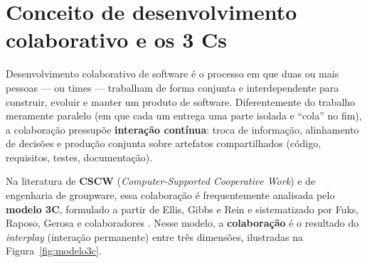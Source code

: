 \documentclass[
    12pt,
    oneside,
    a4paper,
    article,
    section=TITLE,
    sumario=abnt-6027-2012
]{abntex2}
\begin{document}
\OnehalfSpacing
{}

\imprimircapa

\textual

\section{Conceito de desenvolvimento colaborativo e os 3 Cs}
\label{sec:3cs}

Desenvolvimento colaborativo de software é o processo em que duas ou mais pessoas --- ou times --- trabalham de forma conjunta e interdependente para construir, evoluir e manter um produto de software. Diferentemente do trabalho meramente paralelo (em que cada um entrega uma parte isolada e ``cola'' no fim), a colaboração pressupõe \textbf{interação contínua}: troca de informação, alinhamento de decisões e produção conjunta sobre artefatos compartilhados (código, requisitos, testes, documentação).

Na literatura de \textbf{CSCW} (\textit{Computer-Supported Cooperative Work}) e de engenharia de groupware, essa colaboração é frequentemente analisada pelo \textbf{modelo 3C}, formulado a partir de Ellis, Gibbs e Rein \cite{ellis1991} e sistematizado por Fuks, Raposo, Gerosa e colaboradores \cite{fuks2008}. Nesse modelo, a \textbf{colaboração} é o resultado do \textit{interplay} (interação permanente) entre três dimensões, ilustradas na Figura~\ref{fig:modelo3c}.

\begin{center}
\label{fig:modelo3c}
\end{center}
\end{document}
